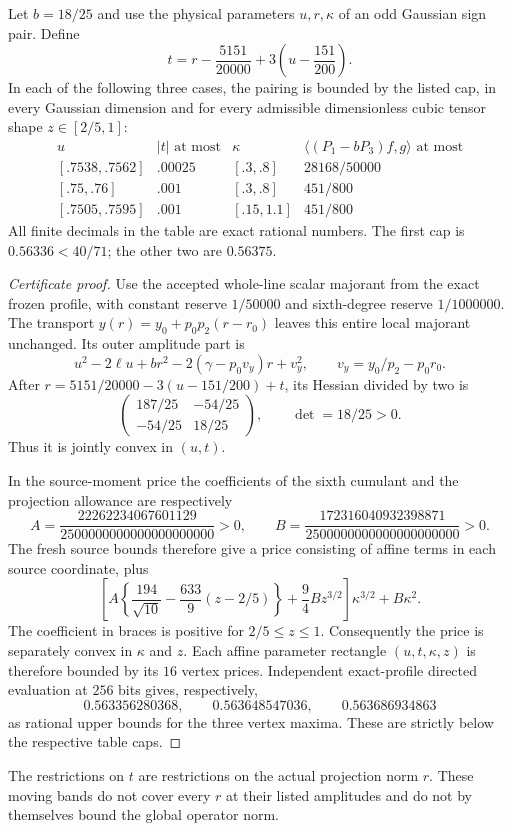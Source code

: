 \begin{proposition}
\label{prop:r3-certified-moving-polygons}
Let $b=18/25$ and use the physical parameters $u,r,\kappa$ of an odd
Gaussian sign pair.  Define
\[
 t=r-\frac{5151}{20000}+3\left(u-\frac{151}{200}\right).
\]
In each of the following three cases, the pairing is bounded by the
listed cap, in every Gaussian dimension and for every admissible
dimensionless cubic tensor shape $z\in[2/5,1]$:
\[
\begin{array}{c|c|c|c}
 u& |t|\text{ at most}&\kappa&
 \langle(P_1-bP_3)f,g\rangle\text{ at most}\\ \hline
 {[.7538,.7562]}&.00025&[.3,.8]&28168/50000\\
 {[.75,.76]}&.001&[.3,.8]&451/800\\
 {[.7505,.7595]}&.001&[.15,1.1]&451/800
\end{array}
\]
All finite decimals in the table are exact rational numbers.  The first
cap is $0.56336<40/71$; the other two are $0.56375$.
\end{proposition}
\begin{proof}[Certificate proof]
Use the accepted whole-line scalar majorant from the exact frozen profile,
with constant reserve $1/50000$ and sixth-degree reserve $1/1000000$.
The transport $y(r)=y_0+p_0p_2(r-r_0)$ leaves this entire local majorant
unchanged.  Its outer amplitude part is
\[
 u^2-2\ell u+br^2-2(\gamma-p_0v_y)r+v_y^2,
 \qquad v_y=y_0/p_2-p_0r_0.
\]
After $r=5151/20000-3(u-151/200)+t$, its Hessian divided by two is
\[
 \begin{pmatrix}187/25&-54/25\\-54/25&18/25\end{pmatrix},
 \qquad \det=18/25>0.
\]
Thus it is jointly convex in $(u,t)$.

In the source-moment price the coefficients of the sixth cumulant and
the projection allowance are respectively
\[
 A=\frac{22262234067601129}{2500000000000000000000}>0,
 \qquad
 B=\frac{172316040932398871}{2500000000000000000000}>0.
\]
The fresh source bounds therefore give a price consisting of affine
terms in each source coordinate, plus
\[
 \left[A\left\{\frac{194}{\sqrt{10}}
       -\frac{633}{9}(z-2/5)\right\}
       +\frac94Bz^{3/2}\right]\kappa^{3/2}+B\kappa^2.
\]
The coefficient in braces is positive for $2/5\leq z\leq1$.
Consequently the price is separately convex in $\kappa$ and $z$.
Each affine parameter rectangle $(u,t,\kappa,z)$ is therefore bounded
by its $16$ vertex prices.  Independent exact-profile directed evaluation
at $256$ bits gives, respectively,
\[
 0.563356280368,\qquad 0.563648547036,\qquad 0.563686934863
\]
as rational upper bounds for the three vertex maxima.  These are strictly
below the respective table caps.
\end{proof}
The restrictions on $t$ are restrictions on the actual projection norm $r$.
These moving bands do not cover every $r$ at their listed amplitudes and
do not by themselves bound the global operator norm.

